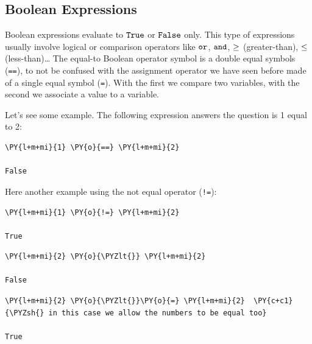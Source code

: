 \subsection{Boolean Expressions}\label{boolean-expressions}

Boolean expressions evaluate to \(\tt{True}\) or \(\tt{False}\) only. This type
of expressions usually involve logical or comparison operators like \(\tt{or}\), \(\tt{and}\), $\tt{\geq}$ (greater-than), $\tt{\leq}$ (less-than)\ldots
The equal-to Boolean operator symbol is a double equal symbols (\texttt{==}), to not be confused with the assignment operator we have seen before made of a single equal symbol (\texttt{=}). With the first we compare two variables, with the second we associate a value to a variable.

Let's see some example. The following expression answers the question is 1 equal to 2:

\begin{codebox}[breakable, size=fbox, boxrule=1pt, pad at break*=1mm, colback=cellbackground, colframe=cellborder]
\begin{Verbatim}[commandchars=\\\{\}]
\PY{l+m+mi}{1} \PY{o}{==} \PY{l+m+mi}{2} 

False
\end{Verbatim}
\end{codebox}

Here another example using the not equal operator (\texttt{!=}):

\begin{codebox}[breakable, size=fbox, boxrule=1pt, pad at break*=1mm, colback=cellbackground, colframe=cellborder]
\begin{Verbatim}[commandchars=\\\{\}]
\PY{l+m+mi}{1} \PY{o}{!=} \PY{l+m+mi}{2}
  
True
\end{Verbatim}
\end{codebox}

\begin{codebox}[breakable, size=fbox, boxrule=1pt, pad at break*=1mm, colback=cellbackground, colframe=cellborder]
\begin{Verbatim}[commandchars=\\\{\}]
\PY{l+m+mi}{2} \PY{o}{\PYZlt{}} \PY{l+m+mi}{2}

False
\end{Verbatim}
\end{codebox}

\begin{codebox}[breakable, size=fbox, boxrule=1pt, pad at break*=1mm, colback=cellbackground, colframe=cellborder]
\begin{Verbatim}[commandchars=\\\{\}]
\PY{l+m+mi}{2} \PY{o}{\PYZlt{}}\PY{o}{=} \PY{l+m+mi}{2}  \PY{c+c1}{\PYZsh{} in this case we allow the numbers to be equal too}

True
\end{Verbatim}
\end{codebox}

